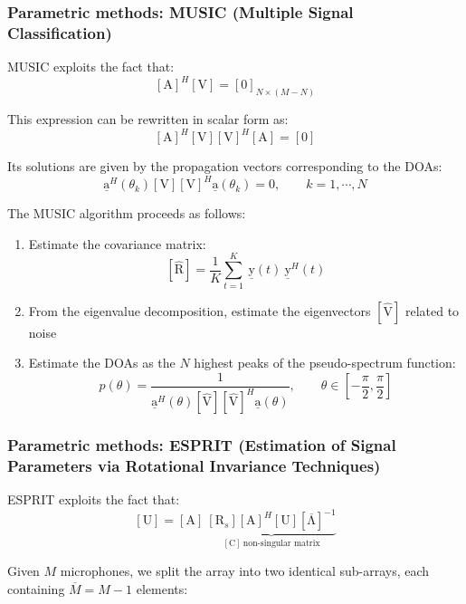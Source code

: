 \subsubsection{Parametric methods: MUSIC (Multiple Signal Classification)}
MUSIC exploits the fact that:
\[
\left[\mathrm{A}\right]^{H} \left[\mathrm{V}\right] = \left[\mathrm{0}\right]_{N \times (M-N)}
\]

This expression can be rewritten in scalar form as:
\[
\left[\mathrm{A}\right]^{H} \left[\mathrm{V}\right] \left[\mathrm{V}\right]^{H} \left[\mathrm{A}\right] = \left[\mathrm{0}\right]
\]

Its solutions are given by the propagation vectors corresponding to the DOAs:
\[
\underline{\mathrm{a}}^{H}(\theta_{k}) \left[\mathrm{V}\right] \left[\mathrm{V}\right]^{H} \underline{\mathrm{a}}(\theta_{k}) = 0,
\qquad k = 1, \cdots, N
\]

The MUSIC algorithm proceeds as follows:
\begin{enumerate}
    \item Estimate the covariance matrix:
    \[
    \left[\hat{\mathrm{R}}\right] = \frac{1}{K} \sum_{t=1}^{K} \ \underline{\mathrm{y}}(t) \ \underline{\mathrm{y}}^{H}(t)
    \]
    
    \item From the eigenvalue decomposition, estimate the eigenvectors $\left[\hat{\mathrm{V}}\right]$ related to noise
    
    \item Estimate the DOAs as the $N$ highest peaks of the pseudo-spectrum function:
    \[
    p(\theta) = \frac{1}{\underline{\mathrm{a}}^{H}(\theta) \left[\hat{\mathrm{V}}\right] \left[\hat{\mathrm{V}}\right]^{H} \underline{\mathrm{a}}(\theta)},
    \qquad \theta \in \left[ -\frac{\pi}{2}, \frac{\pi}{2} \right]
    \]
\end{enumerate}

\subsubsection{Parametric methods: ESPRIT (Estimation of Signal Parameters via Rotational Invariance Techniques)}
ESPRIT exploits the fact that:
\[
\left[\mathrm{U}\right] = \left[\mathrm{A}\right] \ \underbrace{\left[\mathrm{R}_{s}\right] \left[\mathrm{A}\right]^{H} \left[\mathrm{U}\right] \left[\mathrm{\overline{\Lambda}}\right]^{-1}}_{\left[\mathrm{C}\right] \ \text{non-singular matrix}}
\]

Given $M$ microphones, we split the array into two identical sub-arrays, each containing $\overline{M} = M - 1$ elements:


